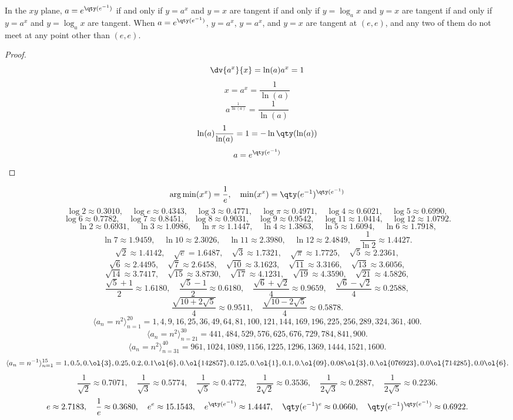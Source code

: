 \documentclass[a4paper,12pt]{article}
\begin{document}
In the $xy$ plane, $a=e^{\qty(e^{-1})}$ if and only if $y=a^x$ and $y=x$ are tangent if and only if $y=\log_ax$ and $y=x$ are tangent if and only if $y=a^x$ and $y=\log_ax$ are tangent. When $a=e^{\qty(e^{-1})}$, $y=a^x$, $y=a^x$, and $y=x$ are tangent at $(e,e)$, and any two of them do not meet at any point other than $(e,e)$.
\begin{proof}
\[\dv{a^x}{x}=\ln(a)a^x=1\]
\[x=a^x=\frac{1}{\ln(a)}\]
\[a^{\frac{1}{\ln(a)}}=\frac{1}{\ln(a)}\]
\[\ln(a)\frac{1}{\ln(a)}=1=-\ln\qty(\ln(a))\]
\[a=e^{\qty(e^{-1})}\]
\end{proof}
\[\arg\min(x^x)=\frac{1}{e},\quad\min(x^x)=\qty(e^{-1})^{\qty(e^{-1})}\]
\[\log 2\approx 0.3010,\quad\log e\approx 0.4343,\quad\log 3\approx 0.4771,\quad\log\pi\approx 0.4971,\quad\log 4\approx 0.6021,\quad\log 5\approx 0.6990,\]
\[\log 6\approx 0.7782,\quad\log 7\approx 0.8451,\quad\log 8\approx 0.9031,\quad\log 9\approx 0.9542,\quad\log 11\approx 1.0414,\quad\log 12\approx 1.0792.\]
\[\ln 2\approx 0.6931,\quad\ln 3\approx 1.0986,\quad\ln\pi\approx 1.1447,\quad\ln 4\approx 1.3863,\quad\ln 5\approx 1.6094,\quad\ln 6\approx 1.7918,\]
\[\ln 7\approx 1.9459,\quad\ln 10\approx 2.3026,\quad\ln 11\approx 2.3980,\quad\ln 12\approx 2.4849,\quad\frac{1}{\ln 2}\approx 1.4427.\]
\[\sqrt{2}\approx 1.4142,\quad\sqrt{e}=1.6487,\quad\sqrt{3}\approx 1.7321,\quad\sqrt{\pi}\approx 1.7725,\quad\sqrt{5}\approx 2.2361,\]
\[\sqrt{6}\approx 2.4495,\quad\sqrt{7}\approx 2.6458,\quad\sqrt{10}\approx 3.1623,\quad\sqrt{11}\approx 3.3166,\quad\sqrt{13}\approx 3.6056,\]
\[\sqrt{14}\approx 3.7417,\quad\sqrt{15}\approx 3.8730,\quad\sqrt{17}\approx 4.1231,\quad\sqrt{19}\approx 4.3590,\quad\sqrt{21}\approx 4.5826,\]
\[\frac{\sqrt{5}+1}{2}\approx 1.6180,\quad\frac{\sqrt{5}-1}{2}\approx 0.6180,\quad\frac{\sqrt{6}+\sqrt{2}}{4}\approx 0.9659,\quad\frac{\sqrt{6}-\sqrt{2}}{4}\approx 0.2588,\]
\[\frac{\sqrt{10+2\sqrt{5}}}{4}\approx 0.9511,\quad\frac{\sqrt{10-2\sqrt{5}}}{4}\approx 0.5878.\]
\[\langle a_n=n^2\rangle_{n=1}^{20}=1,4,9,16,25,36,49,64,81,100,121,144,169,196,225,256,289,324,361,400.\]
\[\langle a_n=n^2\rangle_{n=21}^{30}=441,484,529,576,625,676,729,784,841,900.\]
\[\langle a_n=n^2\rangle_{n=31}^{40}=961,1024,1089,1156,1225,1296,1369,1444,1521,1600.\]
\[\langle a_n=n^{-1}\rangle_{n=1}^{15}=1,0.5,0.\ol{3},0.25,0.2,0.1\ol{6},0.\ol{142857},0.125,0.\ol{1},0.1,0.\ol{09},0.08\ol{3},0.\ol{076923},0.0\ol{714285},0.0\ol{6}.\]
\[\frac{1}{\sqrt{2}}\approx 0.7071,\quad\frac{1}{\sqrt{3}}\approx 0.5774,\quad\frac{1}{\sqrt{5}}\approx 0.4772,\quad\frac{1}{2\sqrt{2}}\approx 0.3536,\quad\frac{1}{2\sqrt{3}}\approx 0.2887,\quad\frac{1}{2\sqrt{5}}\approx 0.2236.\]
\[e\approx 2.7183,\quad\frac{1}{e}\approx 0.3680,\quad e^e\approx 15.1543,\quad e^{\qty(e^{-1})}\approx 1.4447,\quad \qty(e^{-1})^e\approx 0.0660,\quad\qty(e^{-1})^{\qty(e^{-1})}\approx 0.6922.\]
\end{document}
